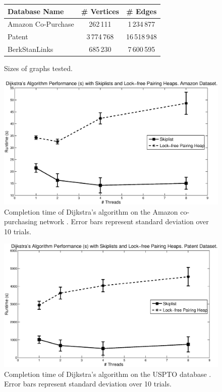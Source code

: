 \documentclass{acm_proc_article-sp}
\begin{document}
\begin{figure}
  \begin{tabular}{|l|c|c|}
    \hline
    \textbf{Database Name} & \textbf{\# Vertices} & \textbf{\# Edges} \\ \hline
    Amazon Co-Purchase & 262\,111 & 1\,234\,877 \\ \hline
    Patent & 3\,774\,768 & 16\,518\,948 \\ \hline
    BerkStanLinks & 685\,230 & 7\,600\,595 \\ \hline
  \end{tabular}
  \label{fig:graphsizes}
  \caption{Sizes of graphs tested.}
\end{figure}

\begin{figure}
  \includegraphics[width=1.0\textwidth]{img/amazon.eps}
  \caption{Completion time of Dijkstra's algorithm on the Amazon co-purchasing network \cite{leskovec07}. Error bars represent standard deviation over 10 trials.}
  \label{fig:ph:amazon}
\end{figure}

\begin{figure}
  \includegraphics[width=1.0\textwidth]{img/patent.eps}
  \caption{Completion time of Dijkstra's algorithm on the USPTO database \cite{leskovec05}. Error bars represent standard deviation over 10 trials.}
  \label{fig:ph:patent}
\end{figure}
\end{document}
